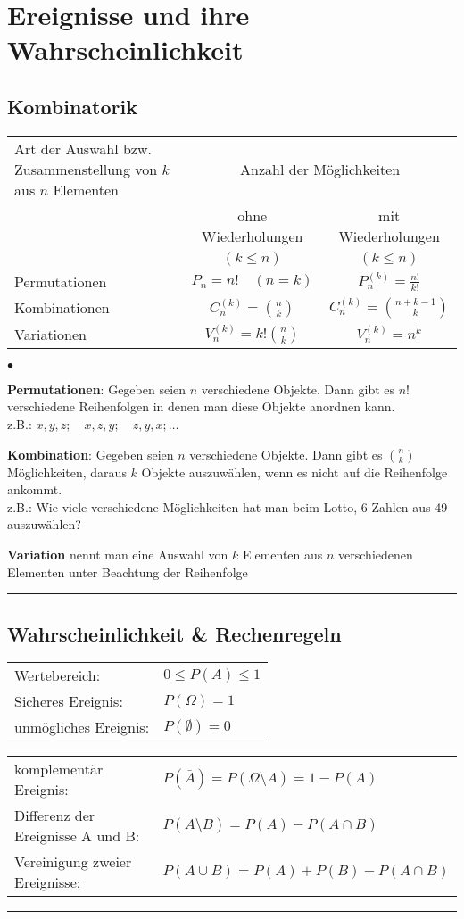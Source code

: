 \section{Ereignisse und ihre Wahrscheinlichkeit}

\subsection{Kombinatorik }
\begin{tabular}{| p{5.5cm} | c | c |}
  \hline
  Art der Auswahl bzw. Zusammenstellung von $k$ aus $n$ Elementen &
  \multicolumn{2}{|c|}{Anzahl der Möglichkeiten} \\
  & ohne Wiederholungen & mit Wiederholungen \\
 	&	$(k\leq n)$         & $(k\leq n)$ \\
 	\hline
 	Permutationen & $P_n=n!\quad(n=k)$       & $P_n^{(k)}=\frac{n!}{k!}$ \\
 	Kombinationen & $C_n^{(k)}=\binom n k$   & $C_n^{(k)}=\binom{n+k-1} k$ \\
  Variationen   & $V_n^{(k)}=k!\binom n k$ & $V_n^{(k)}=n^k$\\
  \hline
\end{tabular}
\begin{list}{$\bullet$}{\setlength{\itemsep}{0cm} \setlength{\parsep}{0cm}
\setlength{\topsep}{0.1cm}}
  \item \textbf{Permutationen}: Gegeben seien $n$ verschiedene Objekte. Dann
    gibt es $n!$ verschiedene Reihenfolgen in denen man diese Objekte anordnen
    kann. \\
    z.B.: $x,y,z;\quad x,z,y;\quad z,y,x;\ldots$
  \item \textbf{Kombination}: Gegeben seien $n$ verschiedene Objekte. Dann gibt
    es $\binom n k$ Möglichkeiten, daraus $k$ Objekte auszuwählen, wenn es nicht
    auf die Reihenfolge ankommt. \\
    z.B.: Wie viele verschiedene Möglichkeiten hat man beim Lotto, 6 Zahlen aus
    49 auszuwählen?
  \item \textbf{Variation} nennt man eine Auswahl von $k$ Elementen aus $n$
    verschiedenen Elementen unter Beachtung der Reihenfolge
\end{list}
\hrule

\subsection{Wahrscheinlichkeit \& Rechenregeln }
\begin{tabular}{ll}
  Wertebereich:         & ${0}\le{P(A)}\le{1}$\\
  Sicheres Ereignis:    & $P(\Omega)=1$\\
  unmögliches Ereignis: & $P(\emptyset)=0$
\end{tabular}
		\begin{tabular}{ll}
			komplementär Ereignis:
			&$P(\bar{A})=P({\Omega}\setminus{A})=1-P(A)$\\
			Differenz der Ereignisse A und B:
			&$P({A}\setminus{B})=P(A)-P({A}\cap{B})$\\
			Vereinigung zweier Ereignisse:
			&$P({A}\cup{B})=P(A)+P(B)-P({A}\cap{B})$
		\end{tabular}
\hrule

